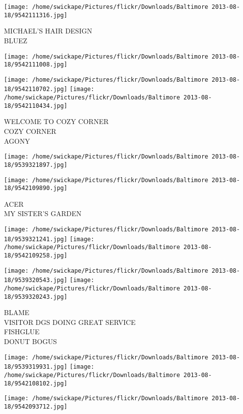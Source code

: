 \documentclass[10pt,letterpaper]{article}
\begin{document}
\vspace{0.25in}
\texttt{[image: /home/swickape/Pictures/flickr/Downloads/Baltimore 2013-08-18/9542111316.jpg]}

MICHAEL'S HAIR DESIGN\\
BLUEZ
\pagebreak

\texttt{[image: /home/swickape/Pictures/flickr/Downloads/Baltimore 2013-08-18/9542111008.jpg]}

\vspace{0.25in}
\texttt{[image: /home/swickape/Pictures/flickr/Downloads/Baltimore 2013-08-18/9542110702.jpg]}
\texttt{[image: /home/swickape/Pictures/flickr/Downloads/Baltimore 2013-08-18/9542110434.jpg]}

WELCOME TO COZY CORNER\\
COZY CORNER\\
AGONY
\pagebreak

\texttt{[image: /home/swickape/Pictures/flickr/Downloads/Baltimore 2013-08-18/9539321897.jpg]}

\vspace{0.25in}
\texttt{[image: /home/swickape/Pictures/flickr/Downloads/Baltimore 2013-08-18/9542109890.jpg]}

ACER\\
MY SISTER'S GARDEN
\pagebreak

\texttt{[image: /home/swickape/Pictures/flickr/Downloads/Baltimore 2013-08-18/9539321241.jpg]}
\texttt{[image: /home/swickape/Pictures/flickr/Downloads/Baltimore 2013-08-18/9542109258.jpg]}

\texttt{[image: /home/swickape/Pictures/flickr/Downloads/Baltimore 2013-08-18/9539320543.jpg]}
\texttt{[image: /home/swickape/Pictures/flickr/Downloads/Baltimore 2013-08-18/9539320243.jpg]}

BLAME\\
VISITOR DGS DOING GREAT SERVICE\\
FISHGLUE\\
DONUT BOGUS
\pagebreak

\texttt{[image: /home/swickape/Pictures/flickr/Downloads/Baltimore 2013-08-18/9539319931.jpg]}
\texttt{[image: /home/swickape/Pictures/flickr/Downloads/Baltimore 2013-08-18/9542108102.jpg]}

\vspace{0.25in}
\texttt{[image: /home/swickape/Pictures/flickr/Downloads/Baltimore 2013-08-18/9542093712.jpg]}
\end{document}
